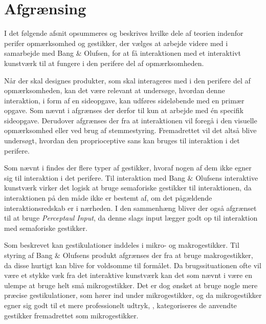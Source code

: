 \section{Afgrænsing}
\label{Afgraensning}
%
I det følgende afsnit opsummeres og beskrives hvilke dele af teorien indenfor perifer opmærksomhed og gestikker, der vælges at arbejde videre med i samarbejde med Bang $\&$ Olufsen, for at få interaktionen med et interaktivt kunstværk til at fungere i den perifere del af opmærksomheden. 

Når der skal designes produkter, som skal interageres med i den perifere del af opmærksomheden, kan det være relevant at undersøge, hvordan denne interaktion, i form af en sideopgave, kan udføres sideløbende med en primær opgave. Som nævnt i  afgrænses der derfor til kun at arbejde med én specifik sideopgave. Derudover afgrænses der fra at interaktionen vil foregå i den visuelle opmærksomhed eller ved brug af stemmestyring. Fremadrettet vil det altså blive undersøgt, hvordan den proprioceptive sans kan bruges til interaktion i det perifere. 

Som nævnt i  findes der flere typer af gestikker, hvoraf nogen af dem ikke egner sig til interaktion i det perifere. Til interaktion med Bang $\&$ Olufsens interaktive kunstværk virker det logisk at bruge semaforiske gestikker til interaktionen, da interaktionen på den måde ikke er bestemt af, om det pågældende interaktionsredskab er i nærheden. I den sammenhæng bliver der også afgrænset til at bruge \textit{Perceptaul Input}, da denne slags input lægger godt op til interaktion med semaforiske gestikker.

Som beskrevet kan gestikulationer inddeles i mikro- og makrogestikker. Til styring af Bang $\&$ Olufsens produkt afgrænses der fra at bruge makrogestikker, da disse hurtigt kan blive for voldsomme til formålet. Da brugssituationen ofte vil være et stykke væk fra det interaktive kunstværk kan det som nævnt i  være en ulempe at bruge helt små mikrogestikker. Det er dog ønsket at bruge nogle mere præcise gestikulationer, som hører ind under mikrogestikker, og da mikrogestikker egner sig godt til et mere professionelt udtryk, \parencite[s. 10]{PDF:UsabilityofMicroVsMacroGestures}, kategoriseres de anvendte gestikker fremadrettet som mikrogestikker. 

